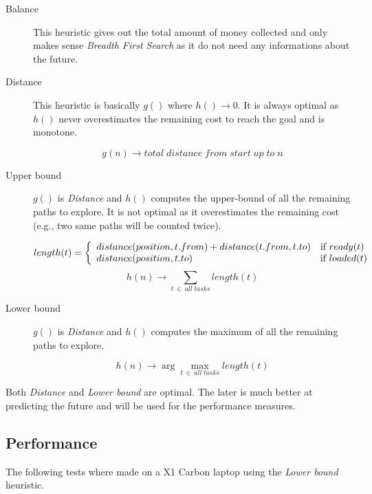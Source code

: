 \documentclass[11pt,a4paper]{article}
\begin{document}
\begin{description}
    \item[Balance] This heuristic gives out the total amount of money
        collected and only makes sense \emph{Breadth First Search} as it do not
        need any informations about the future.

    \item[Distance] This heuristic is basically $g()$ where $h() \rightarrow
        0$. It is always optimal as $h()$ never overestimates the remaining
        cost to reach the goal and is monotone.

        $$g(n) \rightarrow total \; distance \; from \; start \; up \; to \; n$$

    \item[Upper bound] $g()$ is \emph{Distance} and $h()$ computes the
        upper-bound of all the remaining paths to explore. It is not optimal as
        it overestimates the remaining cost (e.g., two same paths will be
        counted twice).

        \[
        length(t) = \left\{
            \begin{array}{l l}
                distance(position, t.from) + distance(t.from, t.to)& \text{if } ready(t) \\
                distance(position, t.to) & \text{if } loaded(t)
            \end{array}
        \right.
        \]
        $$h(n) \rightarrow \sum_{t \: \in \: all \; tasks} length(t)$$

    \item[Lower bound] $g()$ is \emph{Distance} and $h()$ computes the maximum
        of all the remaining paths to explore.

        $$h(n) \rightarrow \arg\max_{t \: \in \: all \; tasks} length(t)$$

\end{description}

Both \emph{Distance} and \emph{Lower bound} are optimal. The later is much
better at predicting the future and will be used for the performance measures.


\subsection*{Performance}

The following tests where made on a X1 Carbon laptop using the \emph{Lower
bound} heuristic.
\end{document}

